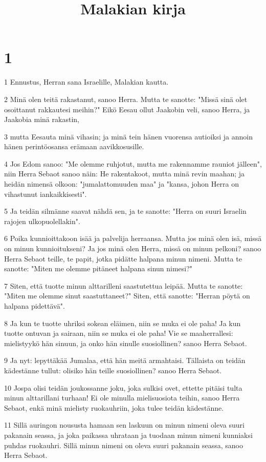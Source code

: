 

\title{Malakian kirja}


\chapter{1}

\par 1 Ennustus, Herran sana Israelille, Malakian kautta.
\par 2 Minä olen teitä rakastanut, sanoo Herra. Mutta te sanotte: "Missä sinä olet osoittanut rakkautesi meihin?" Eikö Eesau ollut Jaakobin veli, sanoo Herra, ja Jaakobia minä rakastin,
\par 3 mutta Eesauta minä vihasin; ja minä tein hänen vuorensa autioiksi ja annoin hänen perintöosansa erämaan aavikkosusille.
\par 4 Jos Edom sanoo: "Me olemme ruhjotut, mutta me rakennamme rauniot jälleen", niin Herra Sebaot sanoo näin: He rakentakoot, mutta minä revin maahan; ja heidän nimensä olkoon: "jumalattomuuden maa" ja "kansa, johon Herra on vihastunut iankaikkisesti".
\par 5 Ja teidän silmänne saavat nähdä sen, ja te sanotte: "Herra on suuri Israelin rajojen ulkopuolellakin".
\par 6 Poika kunnioittakoon isää ja palvelija herraansa. Mutta jos minä olen isä, missä on minun kunnioitukseni? Ja jos minä olen Herra, missä on minun pelkoni? sanoo Herra Sebaot teille, te papit, jotka pidätte halpana minun nimeni. Mutta te sanotte: "Miten me olemme pitäneet halpana sinun nimesi?"
\par 7 Siten, että tuotte minun alttarilleni saastutettua leipää. Mutta te sanotte: "Miten me olemme sinut saastuttaneet?" Siten, että sanotte: "Herran pöytä on halpana pidettävä".
\par 8 Ja kun te tuotte uhriksi sokean eläimen, niin se muka ei ole paha! Ja kun tuotte ontuvan ja sairaan, niin se muka ei ole paha! Vie se maaherrallesi: mielistyykö hän sinuun, ja onko hän sinulle suosiollinen? sanoo Herra Sebaot.
\par 9 Ja nyt: lepyttäkää Jumalaa, että hän meitä armahtaisi. Tällaista on teidän kädestänne tullut: olisiko hän teille suosiollinen? sanoo Herra Sebaot.
\par 10 Jospa olisi teidän joukossanne joku, joka sulkisi ovet, ettette pitäisi tulta minun alttarillani turhaan! Ei ole minulla mielisuosiota teihin, sanoo Herra Sebaot, enkä minä mielisty ruokauhriin, joka tulee teidän kädestänne.
\par 11 Sillä auringon noususta hamaan sen laskuun on minun nimeni oleva suuri pakanain seassa, ja joka paikassa uhrataan ja tuodaan minun nimeni kunniaksi puhdas ruokauhri. Sillä minun nimeni on oleva suuri pakanain seassa, sanoo Herra Sebaot.
